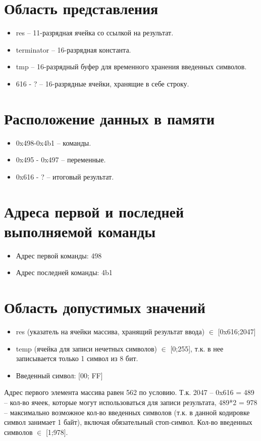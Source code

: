 \documentclass{article}
\begin{document}
\section{Область представления}
\begin{itemize}
  \item	res – 11-разрядная ячейка со ссылкой на результат.
  \item terminator – 16-разрядная константа.
  \item tmp – 16-разрядный буфер для временного хранения введенных символов.
  \item 616 - ? – 16-разрядные ячейки, хранящие в себе строку.
\end{itemize}

\section{Расположение данных в памяти}

\begin{itemize}
  \item 0x498-0x4b1 – команды.
  \item 0x495 - 0x497 – переменные.
  \item 0x616 - ? – итоговый результат.
\end{itemize}


\section{Адреса первой и последней выполняемой команды}

\begin{itemize}
  \item Адрес первой команды: 498
  \item Адрес последней команды: 4b1
\end{itemize}

\section{Область допустимых значений}
\begin{itemize}
  \item res (указатель на ячейки массива, хранящий результат ввода) $\in$ [0x616;2047]
  \item temp (ячейка для записи нечетных символов)  $\in$ [0;255], т.к. в нее записывается только 1
        символ из 8 бит.
  \item Введенный символ: [00; FF]
\end{itemize}
Адрес первого элемента массива равен 562 по условию. Т.к. 2047 – 0x616 = 489 – кол-во ячеек,
которые могут использоваться для записи результата, 489*2 = 978 – максимально возможное
кол-во введенных символов (т.к. в данной кодировке символ занимает 1 байт), включая обязательный
стоп-символ. Кол-во введенных символов  $\in$ [1;978].
\end{document}
